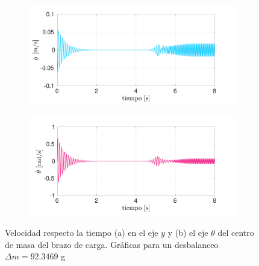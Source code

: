 \begin{figure}[p]
\centering
	\begin{subfigure}{1\linewidth}
		\centering
		\includegraphics[width=1\linewidth]{Imagenes/yp_2.pdf}
		\caption{}\label{fig:yp_2}
	\end{subfigure}
	\begin{subfigure}{1\linewidth}
		\centering
		\includegraphics[width=1\linewidth]{Imagenes/tp_2.pdf}
		\caption{}\label{fig:tp_2}
	\end{subfigure}
\par\bigskip
\caption{Velocidad respecto la tiempo (a) en el eje $y$ y (b) el eje $\theta$ del centro de masa del brazo de carga. Gráficas para un desbalanceo $\Delta m = 92.3469$ g}
\label{fig:ytp_2}
\end{figure}

